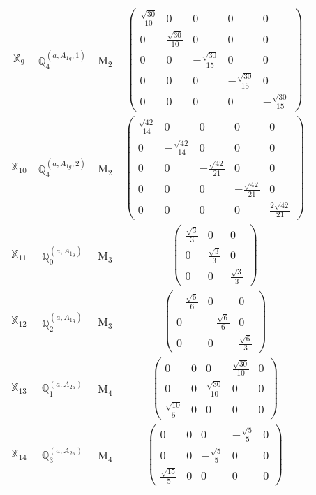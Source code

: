 \documentclass[fleqn,10pt,landscape]{article}
\begin{document}
\begin{itemize}
\begin{center}
\begin{longtable}{c|c|c|c}
$ \mathbb{X}_{9} $ & $\mathbb{Q}_{4}^{(a,A_{1g},1)}$ & M$_{2}$ & $\begin{pmatrix} \frac{\sqrt{30}}{10} & 0 & 0 & 0 & 0 \\ 0 & \frac{\sqrt{30}}{10} & 0 & 0 & 0 \\ 0 & 0 & - \frac{\sqrt{30}}{15} & 0 & 0 \\ 0 & 0 & 0 & - \frac{\sqrt{30}}{15} & 0 \\ 0 & 0 & 0 & 0 & - \frac{\sqrt{30}}{15} \end{pmatrix}$ \\
$ \mathbb{X}_{10} $ & $\mathbb{Q}_{4}^{(a,A_{1g},2)}$ & M$_{2}$ & $\begin{pmatrix} \frac{\sqrt{42}}{14} & 0 & 0 & 0 & 0 \\ 0 & - \frac{\sqrt{42}}{14} & 0 & 0 & 0 \\ 0 & 0 & - \frac{\sqrt{42}}{21} & 0 & 0 \\ 0 & 0 & 0 & - \frac{\sqrt{42}}{21} & 0 \\ 0 & 0 & 0 & 0 & \frac{2 \sqrt{42}}{21} \end{pmatrix}$ \\ \hline
$ \mathbb{X}_{11} $ & $\mathbb{Q}_{0}^{(a,A_{1g})}$ & M$_{3}$ & $\begin{pmatrix} \frac{\sqrt{3}}{3} & 0 & 0 \\ 0 & \frac{\sqrt{3}}{3} & 0 \\ 0 & 0 & \frac{\sqrt{3}}{3} \end{pmatrix}$ \\
$ \mathbb{X}_{12} $ & $\mathbb{Q}_{2}^{(a,A_{1g})}$ & M$_{3}$ & $\begin{pmatrix} - \frac{\sqrt{6}}{6} & 0 & 0 \\ 0 & - \frac{\sqrt{6}}{6} & 0 \\ 0 & 0 & \frac{\sqrt{6}}{3} \end{pmatrix}$ \\ \hline
$ \mathbb{X}_{13} $ & $\mathbb{Q}_{1}^{(a,A_{2u})}$ & M$_{4}$ & $\begin{pmatrix} 0 & 0 & 0 & \frac{\sqrt{30}}{10} & 0 \\ 0 & 0 & \frac{\sqrt{30}}{10} & 0 & 0 \\ \frac{\sqrt{10}}{5} & 0 & 0 & 0 & 0 \end{pmatrix}$ \\
$ \mathbb{X}_{14} $ & $\mathbb{Q}_{3}^{(a,A_{2u})}$ & M$_{4}$ & $\begin{pmatrix} 0 & 0 & 0 & - \frac{\sqrt{5}}{5} & 0 \\ 0 & 0 & - \frac{\sqrt{5}}{5} & 0 & 0 \\ \frac{\sqrt{15}}{5} & 0 & 0 & 0 & 0 \end{pmatrix}$ \\

\end{longtable}
\end{center}
\end{itemize}
\end{document}
